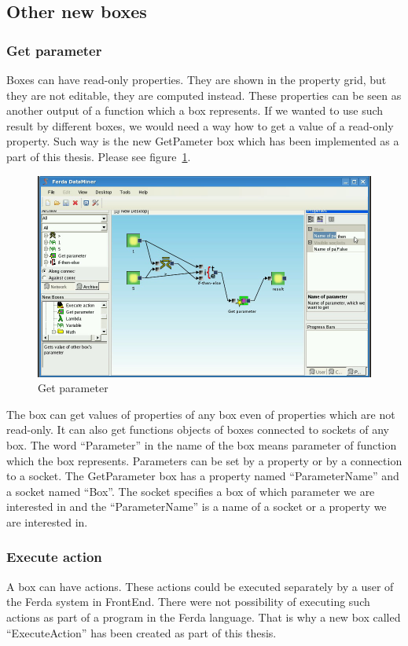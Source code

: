 \documentclass[a4paper,12pt]{book}
\begin{document}
\subsection{Other new boxes}
\subsubsection{Get parameter}
Boxes can have read-only properties. They are shown in the property grid, but they are not editable, they are computed instead. These properties can be seen as another output of a function which a box represents. If we wanted to use such result by different boxes, we would need a way how to get a value of a read-only property. Such way is the new GetPameter box which has been implemented as a part of this thesis. Please see figure~\ref{fig:boxGetParameter}.

\begin{figure}
	\includegraphics[width=1\textwidth]{getParameter2.png}
	\caption{Get parameter}
	\label{fig:boxGetParameter}
\end{figure}

The box can get values of properties of any box even of properties which are not read-only. It can also get functions objects of boxes connected to sockets of any box. The word ``Parameter'' in the name of the box means parameter of function which the box represents. Parameters can be set by a property or by a connection to a socket. The GetParameter box has a property named ``ParameterName'' and a socket named ``Box''. The socket specifies a box of which parameter we are interested in and the ``ParameterName'' is a name of a socket or a property we are interested in.

\subsubsection{Execute action}
A box can have actions. These actions could be executed separately by a user of the Ferda system in FrontEnd. There were not possibility of executing such actions as part of a program in the Ferda language. That is why a new box called ``ExecuteAction'' has been created as part of this thesis.
\end{document}
